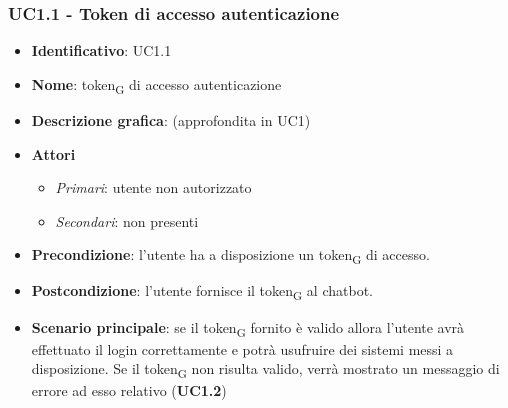 \subsubsection{UC1.1 - Token di accesso autenticazione}
\begin{itemize}
    \item \textbf{Identificativo}: UC1.1
    \item \textbf{Nome}: token\textsubscript{G} di accesso autenticazione
    \item \textbf{Descrizione grafica}: (approfondita in UC1)
    \item \textbf{Attori}
 \begin{itemize} 
    \item \textit{Primari}: utente non autorizzato
    \item \textit{Secondari}: non presenti
 \end{itemize}
 \item \textbf{Precondizione}: l'utente ha a disposizione un token\textsubscript{G} di accesso.
 \item \textbf{Postcondizione}: l'utente fornisce il token\textsubscript{G} al chatbot.
 \item \textbf{Scenario principale}: se il token\textsubscript{G} fornito è valido allora l'utente avrà effettuato il login correttamente e potrà usufruire dei sistemi messi a disposizione. Se il token\textsubscript{G} non risulta valido, verrà mostrato un messaggio di errore ad esso relativo (\textbf{UC1.2})
\end{itemize}

